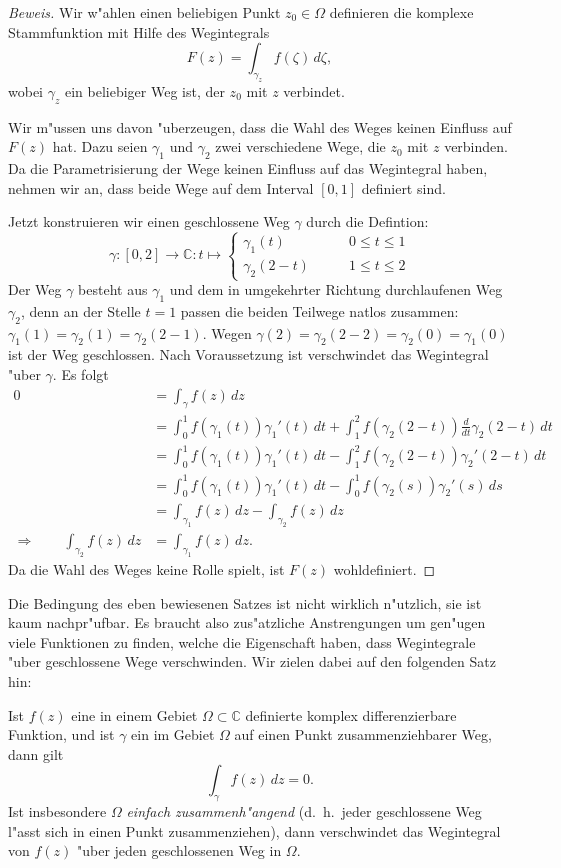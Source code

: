 \begin{proof}[Beweis]
Wir w"ahlen einen beliebigen Punkt $z_0\in\Omega$ definieren die
komplexe Stammfunktion mit Hilfe des Wegintegrals
\[
F(z)=\int_{\gamma_z} f(\zeta)\,d\zeta,
\]
wobei $\gamma_z$ ein beliebiger Weg ist, der $z_0$ mit $z$ verbindet.

Wir m"ussen uns davon "uberzeugen, dass die Wahl des Weges keinen Einfluss
auf $F(z)$ hat.
Dazu seien $\gamma_1$ und $\gamma_2$ zwei verschiedene Wege, die
$z_0$ mit $z$ verbinden.
Da die Parametrisierung der Wege keinen Einfluss auf das Wegintegral haben,
nehmen wir an, dass beide Wege auf dem Interval $[0,1]$ definiert sind.

Jetzt konstruieren wir einen geschlossene Weg $\gamma$ durch die
Defintion:
\[
\gamma\colon[0,2]\to\mathbb C:t\mapsto
\begin{cases}
\gamma_1(t)&\qquad 0\le t\le 1\\
\gamma_2(2-t)&\qquad 1\le t\le 2
\end{cases}
\]
Der Weg $\gamma$ besteht aus $\gamma_1$ und dem in umgekehrter Richtung
durchlaufenen Weg $\gamma_2$, denn an der Stelle $t=1$ passen die
beiden Teilwege natlos zusammen: $\gamma_1(1)=\gamma_2(1)=\gamma_2(2-1)$.
Wegen $\gamma(2)=\gamma_2(2-2)=\gamma_2(0)=\gamma_1(0)$ ist der
Weg geschlossen.
Nach Voraussetzung ist verschwindet das Wegintegral "uber $\gamma$.
Es folgt
\begin{align*}
0
&=
\int_{\gamma}f(z)\,dz
\\
&=
\int_0^1 f(\gamma_1(t))\gamma_1'(t)\,dt
+ \int_1^2f(\gamma_2(2-t))\frac{d}{dt}\gamma_2(2-t)\,dt
\\
&=
\int_0^1 f(\gamma_1(t))\gamma_1'(t)\,dt
- \int_1^2f(\gamma_2(2-t))\gamma_2'(2-t)\,dt
\\
&=
\int_0^1 f(\gamma_1(t))\gamma_1'(t)\,dt
- \int_0^1f(\gamma_2(s))\gamma_2'(s)\,ds
\\
&=
\int_{\gamma_1}f(z)\,dz - \int_{\gamma_2}f(z)\,dz
\\
\Rightarrow\qquad
\int_{\gamma_2}f(z)\,dz&=\int_{\gamma_1}f(z)\,dz.
\end{align*}
Da die Wahl des Weges keine Rolle spielt, ist $F(z)$ wohldefiniert.
\end{proof}

Die Bedingung des eben bewiesenen Satzes ist nicht wirklich n"utzlich,
sie ist kaum nachpr"ufbar.
Es braucht also zus"atzliche Anstrengungen um gen"ugen viele
Funktionen zu finden, welche die Eigenschaft haben, dass Wegintegrale
"uber geschlossene Wege verschwinden.
Wir zielen dabei auf den folgenden Satz hin:
\begin{satz}[Cauchy]
Ist $f(z)$ eine in einem Gebiet $\Omega\subset\mathbb C$ definierte
komplex differenzierbare Funktion, und ist $\gamma$ ein im Gebiet
$\Omega$ auf einen Punkt zusammenziehbarer Weg, dann gilt
\[
\int_{\gamma}f(z)\,dz=0.
\]
Ist insbesondere $\Omega$ {\em einfach zusammenh"angend}
(d.~h.~jeder geschlossene Weg l"asst sich in einen Punkt zusammenziehen),
dann verschwindet das Wegintegral von $f(z)$ "uber jeden geschlossenen
Weg in $\Omega$.
\end{satz}

